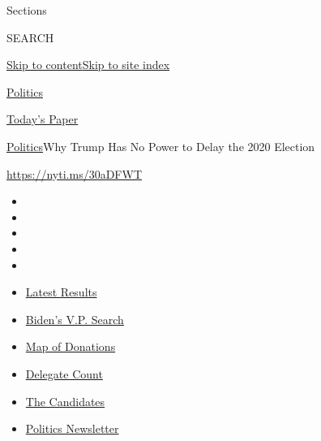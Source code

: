 Sections

SEARCH

\protect\hyperlink{site-content}{Skip to
content}\protect\hyperlink{site-index}{Skip to site index}

\href{https://www.nytimes.com/section/politics}{Politics}

\href{https://myaccount.nytimes.com/auth/login?response_type=cookie\&client_id=vi}{}

\href{https://www.nytimes.com/section/todayspaper}{Today's Paper}

\href{/section/politics}{Politics}\textbar{}Why Trump Has No Power to
Delay the 2020 Election

\url{https://nyti.ms/30aDFWT}

\begin{itemize}
\item
\item
\item
\item
\item
\end{itemize}

\begin{itemize}
\item
  \href{https://www.nytimes.com/interactive/2020/08/04/us/elections/results-arizona-kansas-michigan-missouri-primaries.html?action=click\&pgtype=Article\&state=default\&region=TOP_BANNER\&context=storylines_menu}{Latest
  Results}
\item
  \href{https://www.nytimes.com/article/biden-vice-president-2020.html?action=click\&pgtype=Article\&state=default\&region=TOP_BANNER\&context=storylines_menu}{Biden's
  V.P. Search}
\item
  \href{https://www.nytimes.com/interactive/2020/07/24/us/politics/trump-biden-campaign-donors.html?action=click\&pgtype=Article\&state=default\&region=TOP_BANNER\&context=storylines_menu}{Map
  of Donations}
\item
  \href{https://www.nytimes.com/interactive/2020/us/elections/delegate-count-primary-results.html?action=click\&pgtype=Article\&state=default\&region=TOP_BANNER\&context=storylines_menu}{Delegate
  Count}
\item
  \href{https://www.nytimes.com/interactive/2019/us/politics/2020-presidential-candidates.html?action=click\&pgtype=Article\&state=default\&region=TOP_BANNER\&context=storylines_menu}{The
  Candidates}
\item
  \href{https://www.nytimes.com/newsletters/politics?action=click\&pgtype=Article\&state=default\&region=TOP_BANNER\&context=storylines_menu}{Politics
  Newsletter}
\end{itemize}

